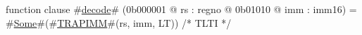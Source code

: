 function clause #\hyperref[zdecode]{decode}# (0b000001 @ rs : regno @ 0b01010 @ imm : imm16) =
  #\hyperref[zSome]{Some}#(#\hyperref[zTRAPIMM]{TRAPIMM}#(rs, imm, LT))  /* TLTI */
